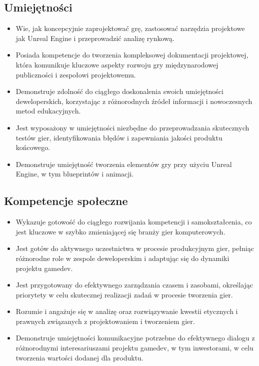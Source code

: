 \documentclass[12pt, a4paper]{article}
\begin{document}
\subsection*{Umiejętności}
\begin{itemize}
  \item Wie, jak koncepcyjnie zaprojektować grę, zastosować narzędzia projektowe jak Unreal Engine i przeprowadzić analizę rynkową.
  \item Posiada kompetencje do tworzenia kompleksowej dokumentacji projektowej, która komunikuje kluczowe aspekty rozwoju gry międzynarodowej publiczności i zespołowi projektowemu.
  \item Demonstruje zdolność do ciągłego doskonalenia swoich umiejętności deweloperskich, korzystając z różnorodnych źródeł informacji i nowoczesnych metod edukacyjnych.
  \item Jest wyposażony w umiejętności niezbędne do przeprowadzania skutecznych testów gier, identyfikowania błędów i zapewniania jakości produktu końcowego.
  \item Demonstruje umiejętność tworzenia elementów gry przy użyciu Unreal Engine, w tym blueprintów i animacji.
\end{itemize}

\subsection*{Kompetencje społeczne}
\begin{itemize}
  \item Wykazuje gotowość do ciągłego rozwijania kompetencji i samokształcenia, co jest kluczowe w szybko zmieniającej się branży gier komputerowych.
  \item Jest gotów do aktywnego uczestnictwa w procesie produkcyjnym gier, pełniąc różnorodne role w zespole deweloperskim i adaptując się do dynamiki projektu gamedev.
  \item Jest przygotowany do efektywnego zarządzania czasem i zasobami, określając priorytety w celu skutecznej realizacji zadań w procesie tworzenia gier.
  \item Rozumie i angażuje się w analizę oraz rozwiązywanie kwestii etycznych i prawnych związanych z projektowaniem i tworzeniem gier.
  \item Demonstruje umiejętności komunikacyjne potrzebne do efektywnego dialogu z różnorodnymi interesariuszami projektu gamedev, w tym inwestorami, w celu tworzenia wartości dodanej dla produktu.
\end{itemize}
\end{document}
